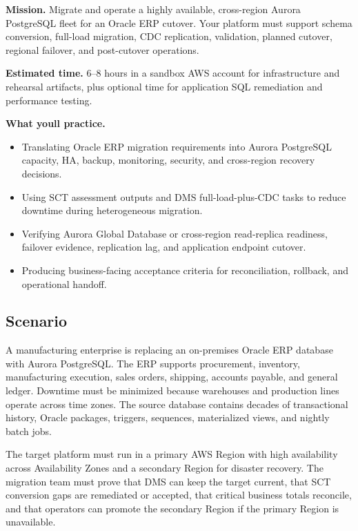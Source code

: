 \begin{capstonebox}
\textbf{Mission.} Migrate and operate a highly available, cross-region Aurora PostgreSQL fleet for an Oracle ERP cutover. Your platform must support schema conversion, full-load migration, CDC replication, validation, planned cutover, regional failover, and post-cutover operations.

\textbf{Estimated time.} 6--8 hours in a sandbox AWS account for infrastructure and rehearsal artifacts, plus optional time for application SQL remediation and performance testing.

\textbf{What you\textquotesingle{}ll practice.}
\begin{itemize}
    \item Translating Oracle ERP migration requirements into Aurora PostgreSQL capacity, HA, backup, monitoring, security, and cross-region recovery decisions.
    \item Using SCT assessment outputs and DMS full-load-plus-CDC tasks to reduce downtime during heterogeneous migration.
    \item Verifying Aurora Global Database or cross-region read-replica readiness, failover evidence, replication lag, and application endpoint cutover.
    \item Producing business-facing acceptance criteria for reconciliation, rollback, and operational handoff.
\end{itemize}
\end{capstonebox}

\subsection*{Scenario}
A manufacturing enterprise is replacing an on-premises Oracle ERP database with Aurora PostgreSQL. The ERP supports procurement, inventory, manufacturing execution, sales orders, shipping, accounts payable, and general ledger. Downtime must be minimized because warehouses and production lines operate across time zones. The source database contains decades of transactional history, Oracle packages, triggers, sequences, materialized views, and nightly batch jobs.

The target platform must run in a primary AWS Region with high availability across Availability Zones and a secondary Region for disaster recovery. The migration team must prove that DMS can keep the target current, that SCT conversion gaps are remediated or accepted, that critical business totals reconcile, and that operators can promote the secondary Region if the primary Region is unavailable.

